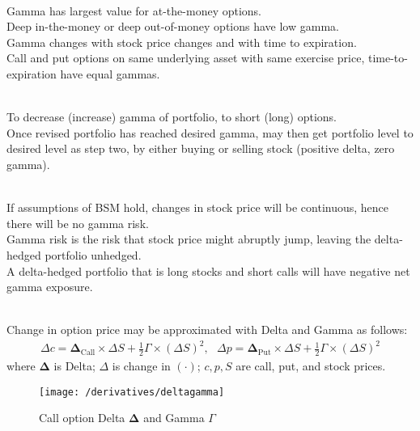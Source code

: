 \begin{remark} \\
Gamma has largest value for at-the-money options.\\
Deep in-the-money or deep out-of-money options have low gamma.\\
Gamma changes with stock price changes and with time to expiration.\\
Call and put options on same underlying asset with same exercise price, time-to-expiration have equal gammas.
\end{remark}

\begin{definition} \\
To decrease (increase) gamma of portfolio, to short (long) options.\\
Once revised portfolio has reached desired gamma, may then get portfolio level to desired level as step two, by either buying or selling stock (positive delta, zero gamma).
\end{definition}

\begin{remark} \\
If assumptions of BSM hold, changes in stock price will be continuous, hence there will be no gamma risk.\\
Gamma risk is the risk that stock price might abruptly jump, leaving the delta-hedged portfolio unhedged.\\
A delta-hedged portfolio that is long stocks and short calls will have negative net gamma exposure.
\end{remark}

\begin{remark} \\
Change in option price may be approximated with Delta and Gamma as follows:
\begin{align}
\Delta c = \bm{\Delta}_{\text{Call}} \times \Delta S + \frac{1}{2} \Gamma \times (\Delta S)^2, \ \ \ \Delta p = \bm{\Delta}_{\text{Put}} \times \Delta S + \frac{1}{2} \Gamma \times (\Delta S)^2 \nonumber
\end{align}
where $\bm{\Delta}$ is Delta; $\Delta$ is change in $(\cdot)$; $c, p, S$ are call, put, and stock prices.
\end{remark}

\begin{figure}[H]
\centering
\texttt{[image: /derivatives/deltagamma]}
\caption{Call option Delta $\bm{\Delta}$ and Gamma $\Gamma$}
\end{figure}

